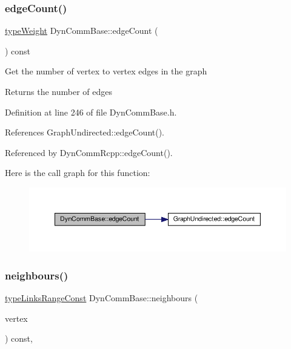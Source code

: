 \subsubsection{\texorpdfstring{edge\+Count()}{edgeCount()}}
{\footnotesize\ttfamily \hyperlink{edge_8h_a2e7ea3be891ac8b52f749ec73fee6dd2}{type\+Weight} Dyn\+Comm\+Base\+::edge\+Count (\begin{DoxyParamCaption}{ }\end{DoxyParamCaption}) const\hspace{0.3cm}{\ttfamily [inline]}}

Get the number of vertex to vertex edges in the graph

\begin{DoxyReturn}{Returns}
the number of edges 
\end{DoxyReturn}


Definition at line 246 of file Dyn\+Comm\+Base.\+h.



References Graph\+Undirected\+::edge\+Count().



Referenced by Dyn\+Comm\+Rcpp\+::edge\+Count().

Here is the call graph for this function\+:
\nopagebreak
\begin{figure}[H]
\begin{center}
\leavevmode
\includegraphics[width=350pt]{classDynCommBase_a5f7d75431e0f774c1c92f096d6a7c429_cgraph}
\end{center}
\end{figure}
\mbox{\label{classDynCommBase_a3500faab82a0547422b2202b79f49718}} 
\subsubsection{\texorpdfstring{neighbours()}{neighbours()}}
{\footnotesize\ttfamily \hyperlink{graphInterface_8h_ae8d27008f15586bbf419af7ad2e0a48a}{type\+Links\+Range\+Const} Dyn\+Comm\+Base\+::neighbours (\begin{DoxyParamCaption}\item[{\hyperlink{edge_8h_a5fbd20c46956d479cb10afc9855223f6}{type\+Vertex}}]{vertex }\end{DoxyParamCaption}) const\hspace{0.3cm}{\ttfamily [inline]}, {\ttfamily [virtual]}}



